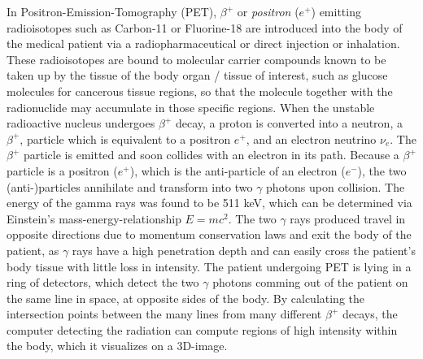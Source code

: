 In Positron-Emission-Tomography (PET), $\beta^+$ or \emph{positron} ($e^+$) emitting radioisotopes such as Carbon-11 or Fluorine-18 are introduced into the body of the medical patient via a radiopharmaceutical or direct injection or inhalation. These radioisotopes are bound to molecular carrier compounds known to be taken up by the tissue of the body organ / tissue of interest, such as glucose molecules for cancerous tissue regions, so that the molecule together with the radionuclide may accumulate in those specific regions. When the unstable radioactive nucleus undergoes $\beta^+$ decay, a proton is converted into a neutron, a $\beta^+$, particle which is equivalent to a positron $e^+$, and an electron neutrino $\nu_{e}$. The $\beta^+$ particle is emitted and soon collides with an electron in its path. Because a $\beta^+$ particle is a positron ($e^+$), which is the anti-particle of an electron ($e^-$), the two (anti-)particles annihilate and transform into two $\gamma$ photons upon collision. The energy of the gamma rays was found to be 511 keV, which can be determined via Einstein's mass-energy-relationship $E=mc^2$. The two $\gamma$ rays produced travel in opposite directions due to momentum conservation laws and exit the body of the patient, as $\gamma$ rays have a high penetration depth and can easily cross the patient's body tissue with little loss in intensity. The patient undergoing PET is lying in a ring of detectors, which detect the two $\gamma$ photons comming out of the patient on the same line in space, at opposite sides of the body. By calculating the intersection points between the many lines from many different $\beta^+$ decays, the computer detecting the radiation can compute regions of high intensity within the body, which it visualizes on a 3D-image.






